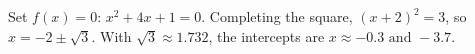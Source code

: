 Set $f(x)=0$: $x^2+4x+1=0$. Completing the square, $(x+2)^2=3$, so $x=-2\pm\sqrt3$. With $\sqrt3\approx1.732$, the intercepts are $x\approx\boxed{-0.3\text{ and }-3.7}$.
